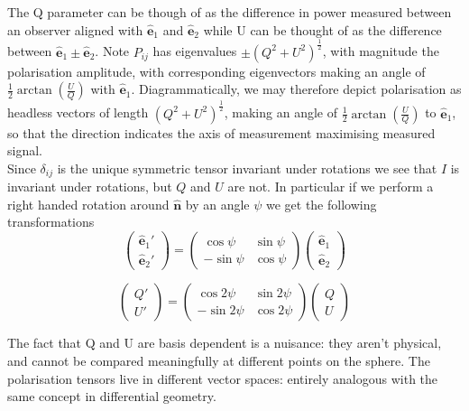 \documentclass[a4paper,10pt]{article}
\renewcommand{\v}[1]{\mathbf{#1}}
\newcommand{\half}{\frac{1}{2}}
\newcommand{\unit}[1]{\hat{\v{#1}}}
\begin{document}
The Q parameter can be though of as the difference in power measured between an observer aligned with $\unit{e}_1$ and $\unit{e}_2$ while U can be thought of as the difference between $\unit{e}_1\pm\unit{e}_2$. Note $P_{ij}$ has eigenvalues $\pm (Q^2 + U^2)^\half$, with magnitude the polarisation amplitude, with corresponding eigenvectors making an angle of $\half\arctan(\frac{U}{Q})$ with $\unit{e}_1$. Diagrammatically, we may therefore depict polarisation as headless vectors of length $(Q^2 + U^2)^\half$, making an angle of $\half\arctan(\frac{U}{Q})$ to $\unit{e}_1$, so that the direction indicates the axis of measurement maximising measured signal.\\

Since $\delta_{ij}$ is the unique symmetric tensor invariant under rotations we see that $I$ is invariant under rotations, but $Q$ and $U$ are not. In particular if we perform a right handed rotation around $\unit{n}$ by an angle $\psi$ we get the following transformations
\begin{equation}
\begin{pmatrix}
\unit{e}_1'\\
\unit{e}_2' 
\end{pmatrix}
=
\begin{pmatrix}
\cos{\psi} & \sin{\psi}\\ 
-\sin{\psi} & \cos{\psi}
\end{pmatrix}
\begin{pmatrix}
\unit{e}_1\\
\unit{e}_2
\end{pmatrix}
\end{equation}


\begin{equation}
\begin{pmatrix}
Q'\\
U' 
\end{pmatrix}
=
\begin{pmatrix}
\cos{2\psi} & \sin{2\psi}\\ 
-\sin{2\psi} & \cos{2\psi}
\end{pmatrix}
\begin{pmatrix}
Q\\
U
\end{pmatrix}
\label{QUtranform}
\end{equation}

The fact that Q and U are basis dependent is a nuisance:  they aren't physical, and cannot be compared meaningfully at different points on the sphere. The polarisation tensors live in different vector spaces: entirely analogous with the same concept in differential geometry. \\
\end{document}
